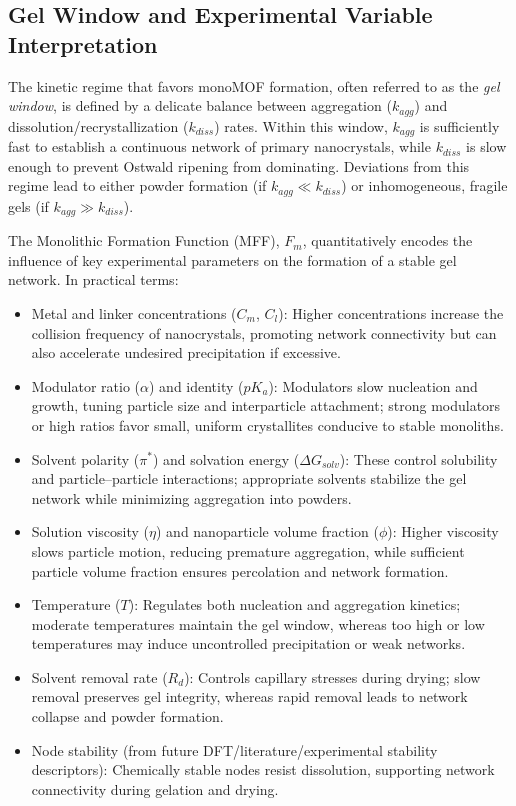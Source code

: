 \documentclass[12pt,a4paper]{article}
\begin{document}
\subsection{Gel Window and Experimental Variable Interpretation}

The kinetic regime that favors monoMOF formation, often referred to as the \textit{gel window}, is defined by a delicate balance between aggregation ($k_{agg}$) and dissolution/recrystallization ($k_{diss}$) rates. Within this window, $k_{agg}$ is sufficiently fast to establish a continuous network of primary nanocrystals, while $k_{diss}$ is slow enough to prevent Ostwald ripening from dominating. Deviations from this regime lead to either powder formation (if $k_{agg} \ll k_{diss}$) or inhomogeneous, fragile gels (if $k_{agg} \gg k_{diss}$).

The Monolithic Formation Function (MFF), $F_m$, quantitatively encodes the influence of key experimental parameters on the formation of a stable gel network. In practical terms: 

\begin{itemize}
    \item Metal and linker concentrations ($C_m$, $C_l$): Higher concentrations increase the collision frequency of nanocrystals, promoting network connectivity but can also accelerate undesired precipitation if excessive. 
    \item Modulator ratio ($\alpha$) and identity ($pK_a$): Modulators slow nucleation and growth, tuning particle size and interparticle attachment; strong modulators or high ratios favor small, uniform crystallites conducive to stable monoliths.
    \item Solvent polarity ($\pi^*$) and solvation energy ($\Delta G_{solv}$): These control solubility and particle–particle interactions; appropriate solvents stabilize the gel network while minimizing aggregation into powders.
    \item Solution viscosity ($\eta$) and nanoparticle volume fraction ($\phi$): Higher viscosity slows particle motion, reducing premature aggregation, while sufficient particle volume fraction ensures percolation and network formation.
    \item Temperature ($T$): Regulates both nucleation and aggregation kinetics; moderate temperatures maintain the gel window, whereas too high or low temperatures may induce uncontrolled precipitation or weak networks.
    \item Solvent removal rate ($R_d$): Controls capillary stresses during drying; slow removal preserves gel integrity, whereas rapid removal leads to network collapse and powder formation.
    \item Node stability (from future DFT/literature/experimental stability descriptors): Chemically stable nodes resist dissolution, supporting network connectivity during gelation and drying.
\end{itemize}
\end{document}
